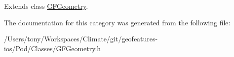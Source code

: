 Extends class \hyperlink{interface_g_f_geometry_a69a56e7786e1de09034c546ade1c7262}{G\+F\+Geometry}.



The documentation for this category was generated from the following file\+:\begin{DoxyCompactItemize}
\item 
/\+Users/tony/\+Workspaces/\+Climate/git/geofeatures-\/ios/\+Pod/\+Classes/G\+F\+Geometry.\+h\end{DoxyCompactItemize}
